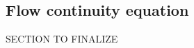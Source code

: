 \documentclass[letterpaper,12pt,oneside]{report}
\begin{document}
\subsection{Flow continuity equation}
SECTION TO FINALIZE
%
%
%
\end{document}
